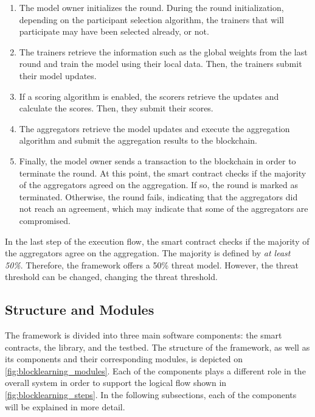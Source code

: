 \begin{enumerate}
    \item The model owner initializes the round. During the round initialization, depending on the participant selection algorithm, the trainers that will participate may have been selected already, or not.
    
    \item The trainers retrieve the information such as the global weights from the last round and train the model using their local data. Then, the trainers submit their model updates.
    
    \item If a scoring algorithm is enabled, the scorers retrieve the updates and calculate the scores. Then, they submit their scores.
    
    \item The aggregators retrieve the model updates and execute the aggregation algorithm and submit the aggregation results to the blockchain.
    
    \item Finally, the model owner sends a transaction to the blockchain in order to terminate the round. At this point, the smart contract checks if the majority of the aggregators agreed on the aggregation. If so, the round is marked as terminated. Otherwise, the round fails, indicating that the aggregators did not reach an agreement, which may indicate that some of the aggregators are compromised.
\end{enumerate}

In the last step of the execution flow, the smart contract checks if the majority of the aggregators agree on the aggregation. The majority is defined by \textit{at least 50\%}. Therefore, the framework offers a 50\% threat model. However, the threat threshold can be changed, changing the threat threshold.

\subsection{Structure and Modules}\label{meth:struct_modules}

The framework is divided into three main software components: the smart contracts, the library, and the testbed. The structure of the framework, as well as its components and their corresponding modules, is depicted on \autoref{fig:blocklearning_modules}. Each of the components plays a different role in the overall system in order to support the logical flow shown in \autoref{fig:blocklearning_steps}. In the following subsections, each of the components will be explained in more detail.

